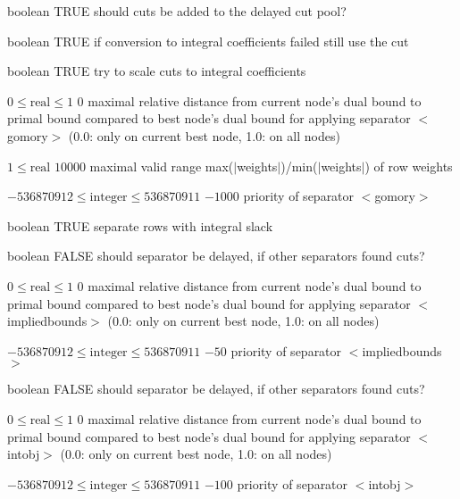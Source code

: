 %
{boolean}%
{TRUE}%
{should cuts be added to the delayed cut pool?}%
{}

%
{boolean}%
{TRUE}%
{if conversion to integral coefficients failed still use the cut}%
{}

%
{boolean}%
{TRUE}%
{try to scale cuts to integral coefficients}%
{}

%
{$0\leq\textrm{real}\leq1$}%
{$0$}%
{maximal relative distance from current node's dual bound to primal bound compared to best node's dual bound for applying separator $<$gomory$>$ (0.0: only on current best node, 1.0: on all nodes)}%
{}

%
{$1\leq\textrm{real}$}%
{$10000$}%
{maximal valid range max($|$weights$|$)/min($|$weights$|$) of row weights}%
{}

%
{$-536870912\leq\textrm{integer}\leq536870911$}%
{$-1000$}%
{priority of separator $<$gomory$>$}%
{}

%
{boolean}%
{TRUE}%
{separate rows with integral slack}%
{}

%
{boolean}%
{FALSE}%
{should separator be delayed, if other separators found cuts?}%
{}

%
{$0\leq\textrm{real}\leq1$}%
{$0$}%
{maximal relative distance from current node's dual bound to primal bound compared to best node's dual bound for applying separator $<$impliedbounds$>$ (0.0: only on current best node, 1.0: on all nodes)}%
{}

%
{$-536870912\leq\textrm{integer}\leq536870911$}%
{$-50$}%
{priority of separator $<$impliedbounds$>$}%
{}

%
{boolean}%
{FALSE}%
{should separator be delayed, if other separators found cuts?}%
{}

%
{$0\leq\textrm{real}\leq1$}%
{$0$}%
{maximal relative distance from current node's dual bound to primal bound compared to best node's dual bound for applying separator $<$intobj$>$ (0.0: only on current best node, 1.0: on all nodes)}%
{}

%
{$-536870912\leq\textrm{integer}\leq536870911$}%
{$-100$}%
{priority of separator $<$intobj$>$}%
{}

